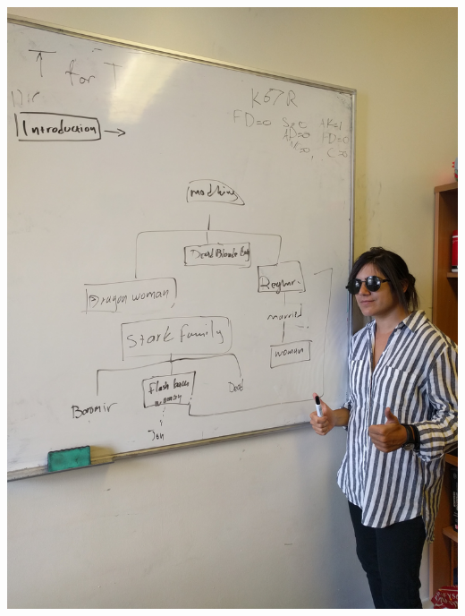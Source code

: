 \documentclass{beamer}
\begin{document}
    \begin{frame}
        \begin{center}
                \includegraphics[height=.95\textheight]{static/whiteboard.jpg}\\
        \end{center}
    \end{frame}
\end{document}
